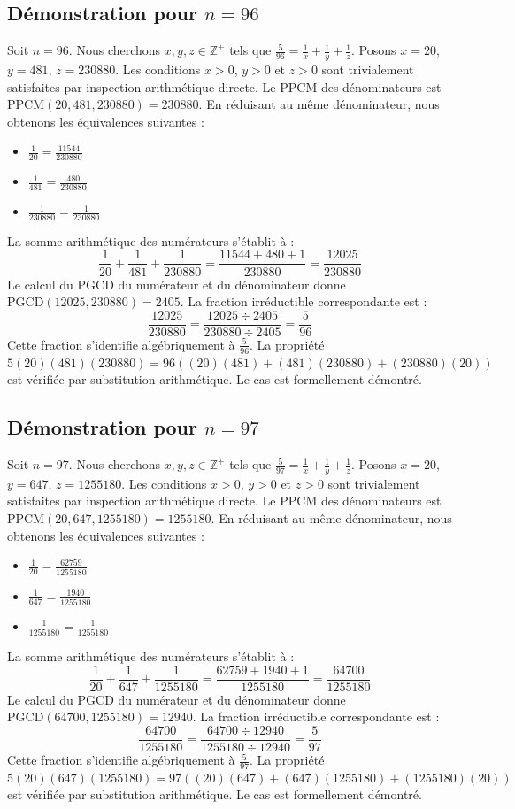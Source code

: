 \documentclass[12pt,a4paper]{article}
\begin{document}
\subsection{Démonstration pour $n = 96$}
Soit $n = 96$. Nous cherchons $x, y, z \in \mathbb{Z}^{+}$ tels que $\frac{5}{96} = \frac{1}{x} + \frac{1}{y} + \frac{1}{z}$.
Posons $x = 20$, $y = 481$, $z = 230880$.
Les conditions $x > 0$, $y > 0$ et $z > 0$ sont trivialement satisfaites par inspection arithmétique directe.
Le PPCM des dénominateurs est $\text{PPCM}(20, 481, 230880) = 230880$.
En réduisant au même dénominateur, nous obtenons les équivalences suivantes :
\begin{itemize}
    \item $\frac{1}{20} = \frac{11544}{230880}$
    \item $\frac{1}{481} = \frac{480}{230880}$
    \item $\frac{1}{230880} = \frac{1}{230880}$
\end{itemize}
La somme arithmétique des numérateurs s'établit à :
$$ \frac{1}{20} + \frac{1}{481} + \frac{1}{230880} = \frac{11544 + 480 + 1}{230880} = \frac{12025}{230880} $$
Le calcul du PGCD du numérateur et du dénominateur donne $\text{PGCD}(12025, 230880) = 2405$.
La fraction irréductible correspondante est :
$$ \frac{12025}{230880} = \frac{12025 \div 2405}{230880 \div 2405} = \frac{5}{96} $$
Cette fraction s'identifie algébriquement à $\frac{5}{96}$.
La propriété $5(20)(481)(230880) = 96((20)(481) + (481)(230880) + (230880)(20))$ est vérifiée par substitution arithmétique.
Le cas est formellement démontré.

\subsection{Démonstration pour $n = 97$}
Soit $n = 97$. Nous cherchons $x, y, z \in \mathbb{Z}^{+}$ tels que $\frac{5}{97} = \frac{1}{x} + \frac{1}{y} + \frac{1}{z}$.
Posons $x = 20$, $y = 647$, $z = 1255180$.
Les conditions $x > 0$, $y > 0$ et $z > 0$ sont trivialement satisfaites par inspection arithmétique directe.
Le PPCM des dénominateurs est $\text{PPCM}(20, 647, 1255180) = 1255180$.
En réduisant au même dénominateur, nous obtenons les équivalences suivantes :
\begin{itemize}
    \item $\frac{1}{20} = \frac{62759}{1255180}$
    \item $\frac{1}{647} = \frac{1940}{1255180}$
    \item $\frac{1}{1255180} = \frac{1}{1255180}$
\end{itemize}
La somme arithmétique des numérateurs s'établit à :
$$ \frac{1}{20} + \frac{1}{647} + \frac{1}{1255180} = \frac{62759 + 1940 + 1}{1255180} = \frac{64700}{1255180} $$
Le calcul du PGCD du numérateur et du dénominateur donne $\text{PGCD}(64700, 1255180) = 12940$.
La fraction irréductible correspondante est :
$$ \frac{64700}{1255180} = \frac{64700 \div 12940}{1255180 \div 12940} = \frac{5}{97} $$
Cette fraction s'identifie algébriquement à $\frac{5}{97}$.
La propriété $5(20)(647)(1255180) = 97((20)(647) + (647)(1255180) + (1255180)(20))$ est vérifiée par substitution arithmétique.
Le cas est formellement démontré.
\end{document}
